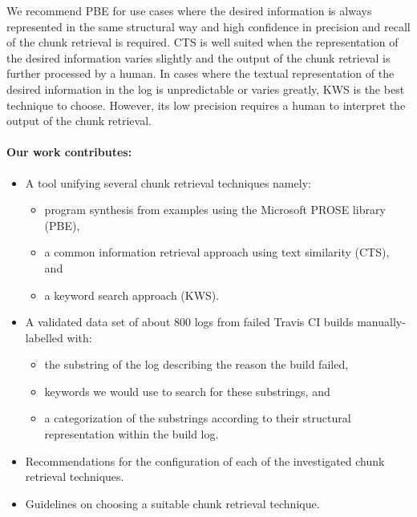 \documentclass[\myrootdir/main.tex]{subfiles}
\begin{document}
We recommend PBE for use cases where the desired information is always represented in the same structural way and high confidence in precision and recall of the chunk retrieval is required.
CTS is well suited when the representation of the desired information varies slightly and the output of the chunk retrieval is further processed by a human.
In cases where the textual representation of the desired information in the log is unpredictable or varies greatly, KWS is the best technique to choose.
However, its low precision requires a human to interpret the output of the chunk retrieval.

\paragraph{Our work contributes:}
\begin{itemize}
  \item A tool unifying several chunk retrieval techniques namely:
        \begin{itemize}
          \item program synthesis from examples using the Microsoft PROSE library (PBE),
          \item a common information retrieval approach using text similarity (CTS), and
          \item a keyword search approach (KWS).
        \end{itemize}
  \item A validated data set of about 800 logs from failed Travis CI builds manually-labelled with:
        \begin{itemize}
          \item the substring of the log describing the reason the build failed,
          \item keywords we would use to search for these substrings, and
          \item a categorization of the substrings according to their structural representation within the build log.
        \end{itemize}
  \item Recommendations for the configuration of each of the investigated chunk retrieval techniques.
  \item Guidelines on choosing a suitable chunk retrieval technique.
\end{itemize}
\end{document}
